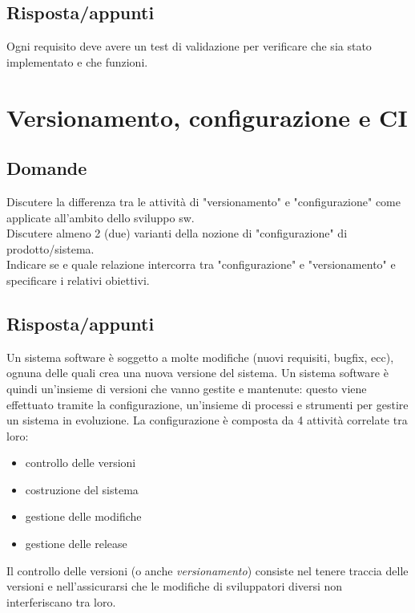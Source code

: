\subsection*{Risposta/appunti}
Ogni requisito deve avere un test di validazione per verificare che sia stato implementato e che funzioni.

\section{Versionamento, configurazione e CI} %

\subsection*{Domande}
Discutere la differenza tra le attività di "versionamento" e "configurazione" come applicate all'ambito dello sviluppo sw.\\

Discutere almeno 2 (due) varianti della nozione di "configurazione" di prodotto/sistema. \\

Indicare se e quale relazione intercorra tra "configurazione" e "versionamento" e specificare i relativi obiettivi.

\subsection*{Risposta/appunti}

Un sistema software è soggetto a molte modifiche (nuovi requisiti, bugfix, ecc), ognuna delle quali crea una nuova versione del sistema. Un sistema software è quindi un'insieme di versioni che vanno gestite e mantenute: questo viene effettuato tramite la configurazione, un'insieme di processi e strumenti per gestire un sistema in evoluzione. 
La configurazione è composta da 4 attività correlate tra loro:
\begin{itemize}
\item controllo delle versioni
\item costruzione del sistema
\item gestione delle modifiche
\item gestione delle release 
\end{itemize}

Il controllo delle versioni (o anche \textit{versionamento}) consiste nel tenere traccia delle versioni e nell'assicurarsi che le modifiche di sviluppatori diversi non interferiscano tra loro.


